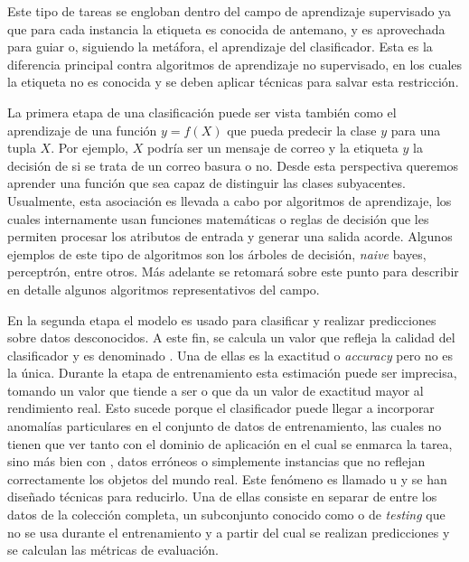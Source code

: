 Este tipo de tareas se engloban dentro del campo de aprendizaje supervisado ya
que para cada instancia la etiqueta es conocida de antemano, y es aprovechada
para guiar o, siguiendo la metáfora,  el aprendizaje del
clasificador. Esta es la diferencia principal contra algoritmos de aprendizaje
no supervisado, en los cuales la etiqueta no es conocida y se deben aplicar
técnicas para salvar esta restricción.

La primera etapa de una clasificación puede ser vista también como el
aprendizaje de una función $y=f(X)$ que pueda predecir la clase $y$ para una
tupla $X$. Por ejemplo, $X$ podría ser un mensaje de correo y la etiqueta $y$ la
decisión de si se trata de un correo basura o no. Desde esta perspectiva
queremos aprender una función que sea capaz de distinguir las clases
subyacentes.  Usualmente, esta asociación es llevada a cabo por algoritmos de
aprendizaje, los cuales internamente usan funciones matemáticas o reglas de
decisión que les permiten procesar los atributos de entrada y generar una salida
acorde. Algunos ejemplos de este tipo de algoritmos son los árboles de decisión,
\textit{naive} bayes, perceptrón, entre otros. Más adelante se retomará sobre
este punto para describir en detalle algunos algoritmos representativos del
campo.

En la segunda etapa el modelo es usado para clasificar y realizar predicciones
sobre datos desconocidos. A este fin, se calcula un valor que refleja la calidad
del clasificador y es denominado . Una de ellas
es la exactitud o \textit{accuracy} pero no es la única.  Durante la etapa de
entrenamiento esta estimación puede ser imprecisa, tomando un valor que tiende a
ser  o que da un valor de exactitud mayor al rendimiento
real.  Esto sucede porque el clasificador puede llegar a incorporar anomalías
particulares en el conjunto de datos de entrenamiento, las cuales no tienen que
ver tanto con el dominio de aplicación en el cual se enmarca la tarea, sino más
bien con , datos erróneos o simplemente instancias que no
reflejan correctamente los objetos del mundo real. Este fenómeno es llamado
 u  y se han diseñado técnicas
para reducirlo. Una de ellas consiste en separar de entre los datos de la
colección completa, un subconjunto conocido como  o
de \textit{testing} que no se usa durante el entrenamiento y a partir del cual
se realizan predicciones y se calculan las métricas de evaluación.

